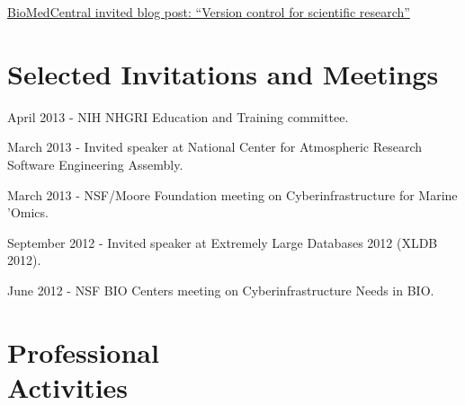 \documentclass[margin,line]{resume}
\begin{document}
\begin{resume}
\href{http://blogs.biomedcentral.com/bmcblog/2013/02/28/version-control-for-scientific-research/}{BioMedCentral invited blog post: ``Version control for scientific research''}

\section{\mysidestyle Selected Invitations and Meetings}

\begin{list1}

\item[] April 2013 - NIH NHGRI Education and Training committee.
\item[] March 2013 - Invited speaker at National Center for Atmospheric Research Software Engineering Assembly.
\item[] March 2013 - NSF/Moore Foundation meeting on Cyberinfrastructure for Marine 'Omics.
\item[] September 2012 - Invited speaker at Extremely Large Databases 2012 (XLDB 2012).
\item[] June 2012 - NSF BIO Centers meeting on Cyberinfrastructure Needs in BIO.

\end{list1}

    \section{\mysidestyle Professional\\Activities}


\end{resume}
\end{document}
